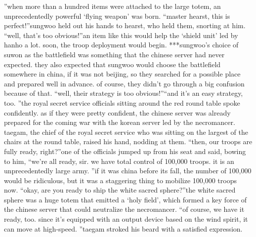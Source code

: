 ”when more than a hundred items were attached to the large totem, an unprecedentedly powerful ‘flying weapon’ was born.
“master hearst, this is perfect!”sungwoo held out his hands to hearst, who held them, snorting at him.
“well, that’s too obvious!”an item like this would help the ‘shield unit’ led by hanho a lot.
soon, the troop deployment would begin.
***sungwoo’s choice of suwon as the battlefield was something that the chinese server had never expected.
 they also expected that sungwoo would choose the battlefield somewhere in china, if it was not beijing, so they searched for a possible place and prepared well in advance.
of course, they didn’t go through a big confusion because of that.
“well, their strategy is too obvious!”“and it’s an easy strategy, too.
”the royal secret service officials sitting around the red round table spoke confidently.
as if they were pretty confident, the chinese server was already prepared for the coming war with the korean server led by the necromancer.
taegam, the chief of the royal secret service who was sitting on the largest of the chairs at the round table, raised his hand, nodding at them.
“then, our troops are fully ready, right?”one of the officials jumped up from his seat and said, bowing to him, “we’re all ready, sir.
 we have total control of 100,000 troops.
 it is an unprecedentedly large army.
”if it was china before its fall, the number of 100,000 would be ridiculous, but it was a staggering thing to mobilize 100,000 troops now.
“okay, are you ready to ship the white sacred sphere?”the white sacred sphere was a huge totem that emitted a ‘holy field’, which formed a key force of the chinese server that could neutralize the necromancer.
“of course, we have it ready, too.
 since it’s equipped with an output device based on the wind spirit, it can move at high-speed.
”taegam stroked his beard with a satisfied expression.


